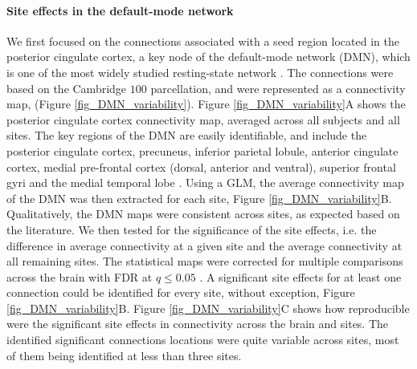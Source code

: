 \documentclass[authoryear]{elsarticle}
\begin{document}
\paragraph{Site effects in the default-mode network} We first focused on the
connections associated with a seed region located in the posterior cingulate cortex, a key
node of the default-mode network (DMN), which is one of the most widely studied
resting-state network \citep{Greicius2004}. The connections were based on the
Cambridge $100$ parcellation, and were represented as a connectivity map, (Figure
\ref{fig_DMN_variability}). Figure \ref{fig_DMN_variability}A shows the posterior cingulate cortex
connectivity map, averaged across all subjects and all sites. The key regions of
the DMN are easily identifiable, and include the posterior cingulate cortex, precuneus, inferior
parietal lobule, anterior cingulate cortex, medial pre-frontal cortex (dorsal,
anterior and ventral), superior frontal gyri and the medial temporal lobe
\citep{Damoiseaux2006,Dansereau2014,Yan2013a}. Using a GLM, the average
connectivity map of the DMN was then extracted for each site, Figure
\ref{fig_DMN_variability}B. Qualitatively, the DMN maps were consistent across
sites, as expected based on the literature. We then tested for the significance
of the site effects, i.e. the difference in average connectivity at a given site
and the average connectivity at all remaining sites. The statistical maps were
corrected for multiple comparisons across the brain with FDR at $q\leq 0.05$
\citep{Benjamini1995}. A significant site effects for at least one connection could be
identified for every site, without exception, Figure
\ref{fig_DMN_variability}B. Figure \ref{fig_DMN_variability}C shows how
reproducible were the significant site effects in connectivity across the brain and
sites. The identified significant connections locations were quite variable across sites, most of them being
identified at less than three sites.
\end{document}

